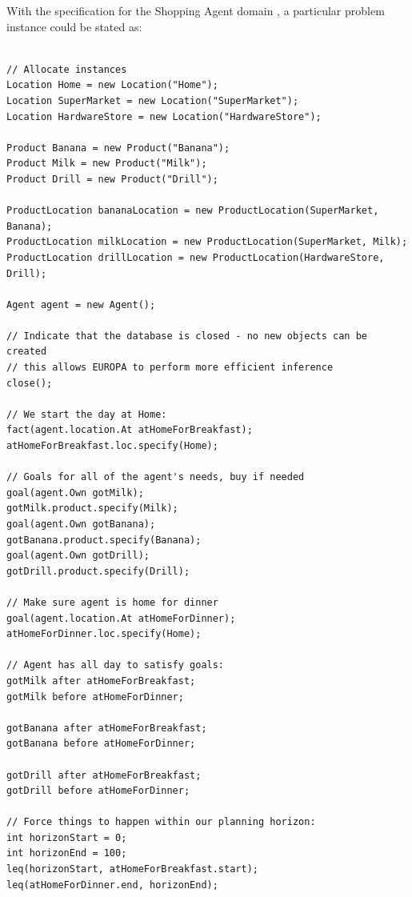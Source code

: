 With the specification for the Shopping Agent domain ,
a particular problem instance could be stated as:

\begin{verbatim}

// Allocate instances
Location Home = new Location("Home");
Location SuperMarket = new Location("SuperMarket");
Location HardwareStore = new Location("HardwareStore");

Product Banana = new Product("Banana");
Product Milk = new Product("Milk");
Product Drill = new Product("Drill");

ProductLocation bananaLocation = new ProductLocation(SuperMarket, Banana);
ProductLocation milkLocation = new ProductLocation(SuperMarket, Milk);
ProductLocation drillLocation = new ProductLocation(HardwareStore, Drill);

Agent agent = new Agent();

// Indicate that the database is closed - no new objects can be created
// this allows EUROPA to perform more efficient inference
close();

// We start the day at Home:
fact(agent.location.At atHomeForBreakfast);
atHomeForBreakfast.loc.specify(Home);

// Goals for all of the agent's needs, buy if needed
goal(agent.Own gotMilk);
gotMilk.product.specify(Milk);
goal(agent.Own gotBanana);
gotBanana.product.specify(Banana);
goal(agent.Own gotDrill);
gotDrill.product.specify(Drill);

// Make sure agent is home for dinner
goal(agent.location.At atHomeForDinner);
atHomeForDinner.loc.specify(Home);

// Agent has all day to satisfy goals:
gotMilk after atHomeForBreakfast;
gotMilk before atHomeForDinner;

gotBanana after atHomeForBreakfast;
gotBanana before atHomeForDinner;

gotDrill after atHomeForBreakfast;
gotDrill before atHomeForDinner;

// Force things to happen within our planning horizon:
int horizonStart = 0;
int horizonEnd = 100;
leq(horizonStart, atHomeForBreakfast.start);
leq(atHomeForDinner.end, horizonEnd);

\end{verbatim}

